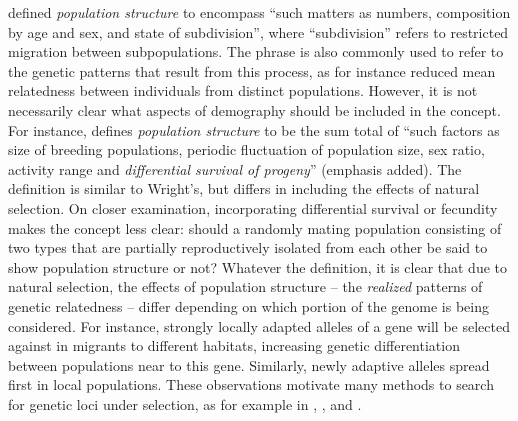 \documentclass[11pt, oneside]{article}   	%
\newif\ifsubmission
\newcommand\citet{\cite}
\newcommand{\citetx}[2][]{\ifsubmission#1 \cite{#2}\else\citet{#2}\fi}
\renewcommand{\revpoint}[2]{\relax}
\begin{document}

\citetx[Wright]{wright1949genetical} defined \emph{population structure} to encompass ``such matters as numbers, composition by age and sex, and state of subdivision'',
where ``subdivision'' refers to restricted migration between subpopulations.
The phrase is also commonly used to refer to the genetic patterns that result from this process,
as for instance reduced mean relatedness between individuals from distinct populations.
However, it is not necessarily clear what aspects of demography should be included in the concept. \revpoint{2}{10}
For instance, 
\citetx[Blair]{blair1943population} defines \emph{population structure} to be the sum total of
``such factors as size of breeding populations, periodic fluctuation of population size, sex ratio, activity range and \emph{differential survival of progeny}'' (emphasis added).
The definition is similar to Wright's, but differs in including the effects of natural selection.
On closer examination, incorporating differential survival or fecundity makes the concept less clear:
should a randomly mating population consisting of two types that are partially reproductively isolated from each other
be said to show population structure or not?
Whatever the definition,
it is clear that due to natural selection, the effects of population structure --
the \emph{realized} patterns of genetic relatedness --
differ depending on which portion of the genome is being considered.
For instance, strongly locally adapted alleles of a gene will be selected against in migrants to different habitats,
increasing genetic differentiation between populations near to this gene.
Similarly, newly adaptive alleles spread first in local populations.
These observations motivate many methods to search for genetic loci under selection,
as for example in \citet{huertasnchez2013genetic}, \citet{martin2016natural}, 
and \citet{duforetfrebourg2015detecting}.
\end{document}

